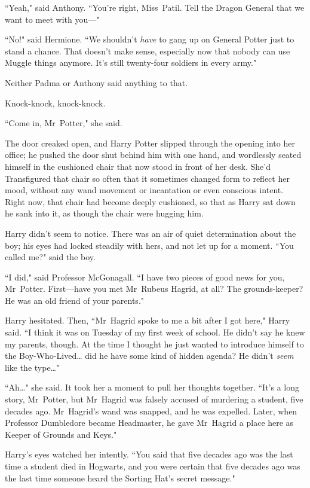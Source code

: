 ``Yeah," said Anthony. ``You're right, Miss~Patil. Tell the Dragon General that we want to meet with you—"

``No!" said Hermione. ``We shouldn't \emph{have} to gang up on General Potter just to stand a chance. That doesn't make sense, especially now that nobody can use Muggle things anymore. It's still twenty-four soldiers in every army."

Neither Padma or Anthony said anything to that.

\later

Knock-knock, knock-knock.

``Come in, Mr~Potter," she said.

The door creaked open, and Harry Potter slipped through the opening into her office; he pushed the door shut behind him with one hand, and wordlessly seated himself in the cushioned chair that now stood in front of her desk. She'd Transfigured that chair so often that it sometimes changed form to reflect her mood, without any wand movement or incantation or even conscious intent. Right now, that chair had become deeply cushioned, so that as Harry sat down he sank into it, as though the chair were hugging him.

Harry didn't seem to notice. There was an air of quiet determination about the boy; his eyes had locked steadily with hers, and not let up for a moment. ``You called me?" said the boy.

``I did," said Professor McGonagall. ``I have two pieces of good news for you, Mr~Potter. First—have you met Mr~Rubeus Hagrid, at all? The grounds-keeper? He was an old friend of your parents."

Harry hesitated. Then, ``Mr~Hagrid spoke to me a bit after I got here," Harry said. ``I think it was on Tuesday of my first week of school. He didn't say he knew my parents, though. At the time I thought he just wanted to introduce himself to the Boy-Who-Lived{\ldots} did he have some kind of hidden agenda? He didn't \emph{seem} like the type{\ldots}"

``Ah{\ldots}" she said. It took her a moment to pull her thoughts together. ``It's a long story, Mr~Potter, but Mr~Hagrid was falsely accused of murdering a student, five decades ago. Mr~Hagrid's wand was snapped, and he was expelled. Later, when Professor Dumbledore became Headmaster, he gave Mr~Hagrid a place here as Keeper of Grounds and Keys."

Harry's eyes watched her intently. ``You said that five decades ago was the last time a student died in Hogwarts, and you were certain that five decades ago was the last time someone heard the Sorting Hat's secret message."

